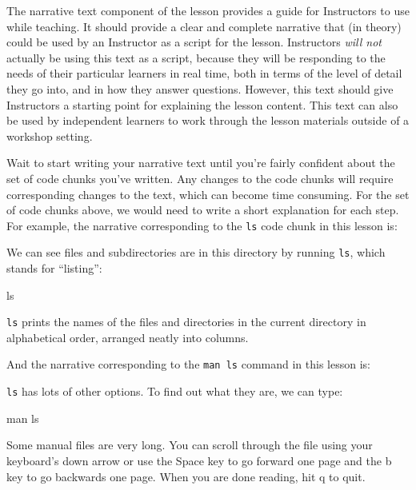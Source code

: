 \documentclass[]{book}
\newenvironment{Shaded}{\begin{snugshade}}{\end{snugshade}}
\newcommand{\FunctionTok}[1]{\textcolor[rgb]{0.00,0.00,0.00}{#1}}
\newcommand{\NormalTok}[1]{#1}
\begin{document}
The narrative text component of the lesson provides a guide for Instructors to use while teaching. It should
provide a clear and complete narrative that (in theory) could be used by an Instructor as a script for
the lesson. Instructors \emph{will not} actually be using this text as a script, because they will be responding to
the needs of their particular learners in real time, both in terms of the level of detail they go into, and
in how they answer questions. However, this text should give Instructors a starting point for explaining the
lesson content. This text can also be used by independent learners to work through the lesson materials outside
of a workshop setting.

Wait to start writing your narrative text until you're fairly confident about the set of code chunks
you've written. Any changes to the code chunks will require corresponding changes to the text, which
can become time consuming. For the set of code chunks above, we would need to write a short explanation for
each step. For example, the narrative corresponding to the \texttt{ls} code chunk in this lesson is:

We can see files and subdirectories are in this directory by running \texttt{ls},
which stands for ``listing'':

\begin{Shaded}
\begin{Highlighting}[]
\FunctionTok{ls}
\end{Highlighting}
\end{Shaded}

\texttt{ls} prints the names of the files and directories in the current directory in
alphabetical order,
arranged neatly into columns.

And the narrative corresponding to the \texttt{man\ ls} command in this lesson is:

\texttt{ls} has lots of other options. To find out what they are, we can type:

\begin{Shaded}
\begin{Highlighting}[]
\FunctionTok{man}\NormalTok{ ls}
\end{Highlighting}
\end{Shaded}

Some manual files are very long. You can scroll through the file using
your keyboard's down arrow or use the Space key to go forward one page
and the b key to go backwards one page. When you are done reading, hit q
to quit.
\end{document}
